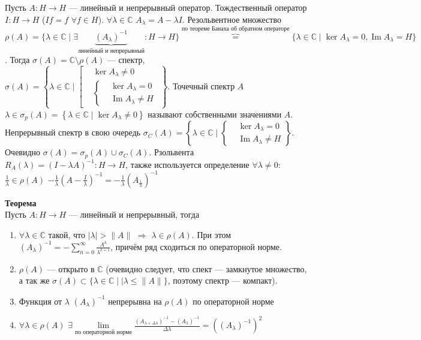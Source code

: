\documentclass[12pt]{article}
\DeclareMathOperator{\Imm}{Im}
\newcommand{\Al}{A_\lambda}
\newcommand{\Rez}{(I - \lambda A)^{-1}}
\begin{document}
Пусть $A : H \to H$ --- линейный и непрерывный оператор.
Тождественный оператор $I : H \to H$ ($If = f$ $\forall f \in H$).
$\forall \lambda \in \mathbb C$ $A_\lambda = A - \lambda I$.
Резольвентное множество $\rho(A) = \{ \lambda \in \mathbb C \mid \exists \underbrace{(A_\lambda)^{-1}}_{\text{линейный и непрерывный}} : H \to H \} 
\overbrace{=}^{\text{по теореме Банаха об обратном операторе}} \{ \lambda \in \mathbb C \mid \ker A_\lambda = 0, \Imm A_\lambda = H \}$.
Тогда $\sigma(A) = \mathbb C \setminus \rho(A)$ --- спектр, $\sigma(A) = \left \{ \lambda \in \mathbb C \mid 
\left [
    \begin{aligned}
        &\ker A_\lambda \ne 0\\
        &\left \{
            \begin{aligned}
                &\ker \Al = 0\\
                &\Imm \Al \ne H
            \end{aligned}
            \right.
    \end{aligned}
\right.\right\}$.
Точечный спектр $A$ $\lambda \in \sigma_p(A)= \left \{ \lambda \in \mathbb C \mid \ker A_\lambda \ne 0 \right\}$ называют собственными значениями $A$.
Непрерывный спектр в свою очередь $\sigma_C(A) =  \left \{ \lambda \in \mathbb C \mid 
\left\{
    \begin{aligned}
                &\ker \Al = 0\\
                &\Imm \Al \ne H
    \end{aligned}
\right.\right \}$.
Очевидно $\sigma(A) = \sigma_p(A) \cup \sigma_C(A)$.
Рзольвента $R_A(\lambda) = \Rez : H \to H$, также используется определение
$\forall \lambda \ne 0$: $\frac{1}{\lambda} \in \rho(A)$ $-\frac{1}{\lambda}(A - \frac{I}{\lambda})^{-1} = -\frac{1}{\lambda}(A_{\frac1{\lambda}})^{-1}$

\textbf{Теорема}\\
Пусть $A : H \to H$ --- линейный и непрерывный, тогда
\begin{enumerate}
    \item{$\forall \lambda \in \mathbb C$ такой, что $|\lambda| > \|A\|$ $\Rightarrow$ $\lambda \in \rho(A)$.
        При этом $(A_\lambda)^{-1} = -\sum \limits_{n = 0}^{\infty}\frac{A^k}{\lambda^{k+1}}$, причём ряд сходиться по операторной норме.}
    \item{$\rho(A)$ --- открыто в $\mathbb C$ (очевидно следует, что спект --- замкнутое множество, а так же $\sigma(A) \subset \{ \lambda \in \mathbb C \mid |\lambda
        \le \|A\|\}$, поэтому спектр --- компакт).}
    \item{Функция от $\lambda$ $(A_\lambda)^{-1}$ непрерывна на $\rho(A)$ по операторной норме}
    \item{$\forall \lambda \in \rho(A)$ $\exists \lim\limits_{\text{по операторной норме}}\frac{(A_{\lambda + \Delta \lambda})^{-1} - (A_\lambda)^{-1}}{\Delta\lambda} =
        ((A_\lambda)^{-1})^2$}
\end{enumerate}
\end{document}
